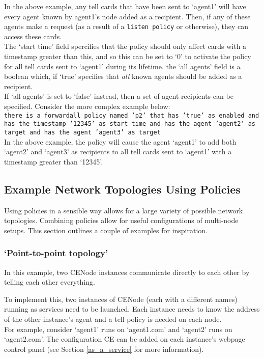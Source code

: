 \documentclass{article}
\begin{document}
In the above example, any tell cards that have been sent to `agent1' will have every agent known by agent1's node added as a recipient. Then, if any of these agents make a request (as a result of a \texttt{listen policy} or otherwise), they can access these cards.\\

The `start time' field spercifies that the policy should only affect cards with a timestamp greater than this, and so this can be set to `0' to activate the policy for all tell cards sent to `agent1' during its lifetime. the `all agents' field is a boolean which, if `true' specifies that \textit{all} known agents should be added as a recipient.\\

If `all agents' is set to `false' instead, then a set of agent recipients can be specified. Consider the more complex example below:\\
\texttt{there is a forwardall policy named 'p2' that has 'true' as enabled and has the timestamp '12345' as start time and has the agent 'agent2' as target and has the agent 'agent3' as target}\\

In the above example, the policy will cause the agent `agent1' to add both `agent2' and `agent3' as recipients to all tell cards sent to `agent1' with a timestamp greater than `12345'.

\subsection{Example Network Topologies Using Policies}
Using policies in a sensible way allows for a large variety of possible network topologies. Combining policies allow for useful configurations of multi-node setups. This section outlines a couple of examples for inspiration.

\subsubsection{`Point-to-point topology'}
In this example, two CENode instances communicate directly to each other by telling each other everything.

To implement this, two instances of CENode (each with a different names) running as services need to be launched. Each instance needs to know the address of the other instance's agent and a tell policy is needed on each node.\\

For example, consider `agent1' runs on `agent1.com' and `agent2' runs on `agent2.com'. The configuration CE can be added on each instance's webpage control panel (see Section \ref{as_a_service} for more information).
\end{document}
